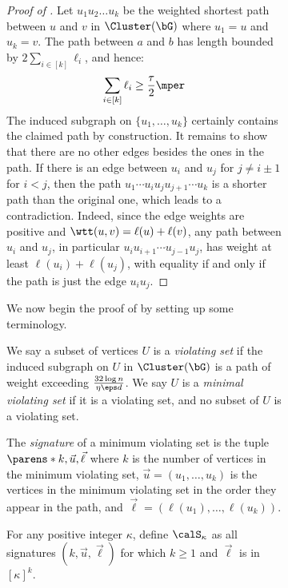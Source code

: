 \documentclass[11pt,letterpaper]{article}
\begin{document}
\begin{figure}
\begin{figure}
\begin{proof}[Proof of ]
        Let $u_1u_2\dots u_k$ be the weighted shortest path between $u$ and $v$ in $\Cluster(\bG)$ where $u_1 = u$ and $u_k = v$. 
        The path between $a$ and $b$ has length bounded by $2\sum_{i\in[k]}\ell_i$, and hence:
        \[
            \sum_{i\in[k]} \ell_i \ge \frac{\tau}{2}\mper
        \]
        The induced subgraph on $\{u_1,\dots,u_k\}$ certainly contains the claimed path by construction.
        It remains to show that there are no other edges besides the ones in the path.
        If there is an edge between $u_i$ and $u_j$ for $j\ne i\pm 1$ for $i < j$, then the path $u_1\cdots u_i u_j u_{j+1} \cdots u_k$ is a shorter path than the original one, which leads to a contradiction.
        Indeed, since the edge weights are positive and $\wtt(u, v) = \ell(u) + \ell(v)$, any path between $u_i$ and $u_j$, in particular $u_i u_{i+1} \cdots u_{j-1} u_j$, has weight at least $\ell(u_i) + \ell(u_j)$, with equality if and only if the path is just the edge $u_iu_j$.
    \end{proof}

    We now begin the proof of  by setting up some terminology.
    \begin{definition}
        We say a subset of vertices $U$ is a \emph{violating set} if the induced subgraph on $U$ in $\Cluster(\bG)$ is a path of weight exceeding $\tfrac{32\log n}{\eta\eps d}$.
        We say $U$ is a \emph{minimal violating set} if it is a violating set, and no subset of $U$ is a violating set.
    \end{definition}

    \begin{definition}[Signature]
        The \emph{signature} of a minimum violating set is the tuple $\parens*{k,\vec{u},\vec{\ell}}$ where $k$ is the number of vertices in the minimum violating set, $\vec{u} = (u_1,\dots,u_k)$ is the vertices in the minimum violating set in the order they appear in the path, and $\vec{\ell} = (\ell(u_1),\dots,\ell(u_k))$.
    \end{definition}

    \begin{notation*}[{$\calS_{\kappa}$}]
        For any positive integer $\kappa$, define $\calS_{\kappa}$ as all signatures $({k,\vec{u},\vec{\ell}})$ for which $k\ge 1$ and $\vec{\ell}$ is in $[\kappa]^{k}$.
    \end{notation*}


\end{figure}
\end{figure}
\end{document}
